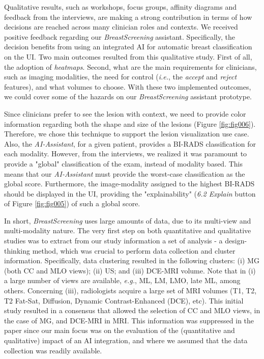 Qualitative results, such as workshops, focus groups, affinity diagrams and feedback from the interviews, are making a strong contribution in terms of how decisions are rea\-ched across many clinician roles and contexts.
We received positive feedback regarding our {\it BreastScreening} assistant.
Specifically, the decision benefits from using an integrated AI for automatic breast classification on the UI.
Two main outcomes resulted from this qualitative study.
First of all, the adoption of {\it heatmaps}.
Second, what are the main requirements for clinicians, such as imaging modalities, the need for control ({\it i.e.}, the {\it accept} and {\it reject} features), and what volumes to choose.
With these two implemented outcomes, we could cover some of the hazards on our {\it Breast\-Screening} assistant prototype.

Since clinicians prefer to see the lesion with context, we need to provide color information regarding both the shape and size of the lesions (Figure \ref{fig:fig006}).
Therefore, we chose this technique to support the lesion visualization use case.
Also, the {\it AI-Assistant}, for a given patient, provides a BI-RADS classification for each modality.
However, from the interviews, we realized it was paramount to provide a "global" classification of the exam, instead of modality based.
This means that our {\it AI-Assistant} must provide the worst-case classification as the global score.
Furthermore, the image-modality assigned to the highest BI-RADS should be displayed in the UI, providing the "explainability" ({\it 6.2 Explain} button of Figure \ref{fig:fig005}) of such a global score.

In short, {\it BreastScreening} uses large amounts of data, due to its multi-view and multi-modality nature.
The very first step on both quantitative and qualitative studies was to extract from our study information a set of analysis - a design-thinking method, which was crucial to perform data collection and cluster information.
Specifically, data clustering resulted in the following clusters:
(i) MG (both CC and MLO views);
(ii) US; and
(iii) DCE-MRI volume.
Note that in (i) a large number of views are available, {\it e.g.}, ML, LM, LMO, late ML, among others.
Concerning (iii), radiologists acquire a large set of MRI volumes (T1, T2, T2 Fat-Sat, Diffusion, Dynamic Contrast-Enhanced (DCE), etc).
This initial study resulted in a consensus that allowed the selection of CC and MLO views, in the case of MG, and DCE-MRI in MRI.
This information was suppressed in the paper since our main focus was on the evaluation of the (quantitative and qualitative) impact of an AI integration, and where we assumed that the data collection was readily available.